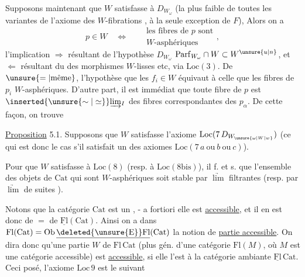 Supposons maintenant que $W$ satisfasse à $D_{W_\omega}$ (la plus faible de toutes les variantes  de l'axiome des $W$-fibrations , à la seule exception de $F$),   Alors on a
\[
p\in W \quad\Longleftrightarrow\quad
\begin{aligned}&\text{les fibres de }p\text{ sont}\\[-2pt]
& W\text{-asphériques}\end{aligned},
\]
l'implication $\Longrightarrow$ résultant de l'hypothèse $D_{W_\omega}$ $\mathrm{Parf}_{W_\omega}\cap W\subset W^{\unsure{u|n}}$, et $\Longleftarrow$ résultant du  des morphismes $W$-lisses etc, via $\mathrm{Loc}(3)$. De $\unsure{=|\text{même}}$, l'hypothèse que les $f_i\in W$ équivaut à celle que les fibres de $p_i$  $W$-asphériques.  D'autre part, il est immédiat que
toute fibre de $p$ est $\inserted{\unsure{\sim|\simeq}}\underrightarrow{\lim}_{I}$ des fibres correspondantes des $p_\alpha$. De cette façon, on trouve

\uline{Proposition} 5.1. Supposons que $W$ satisfasse l'axiome  $\mathrm{Loc}(7\,D_{W_{\unsure{\omega|W|w}}})$ (ce qui est donc le cas s'il satisfait un des axiomes  $\mathrm{Loc}(7\,a\ \text{ou}\ b\ \text{ou}\ c)$).

Pour que $W$ satisfasse à $\mathrm{Loc}(8)$ (resp. à $\mathrm{Loc}(8\mathrm{bis})$), il f. et s.   que l'ensemble des objets de $\mathrm{Cat}$ qui sont $W$-asphériques soit stable par $\underrightarrow{\lim}$ filtrantes (resp. par $\underrightarrow{\lim}$  de suites ).

  Notons que la catégorie $\mathrm{Cat}$ est un , - a fortiori elle est \uline{accessible},  et il en est donc de $=$ de $\underline{\mathrm{Fl}}(\mathrm{Cat})$. Ainsi on a dans $\mathrm{Fl}(\mathrm{Cat})=\mathrm{Ob}\,\underline{\deleted{\unsure{\mathrm{E}}}\mathrm{Fl}}(\mathrm{Cat})$ la notion
de \uline{partie accessible}. On dira donc qu'une partie $W$ de $\mathrm{Fl}\,\mathrm{Cat}$ (plus gén. d'une catégorie $\mathrm{Fl}(M)$, où $M$ est une catégorie accessible) est \uline{accessible}, si elle l'est   à la catégorie ambiante
$\underline{\mathrm{Fl}}\,\mathrm{Cat}$. Ceci posé, l'axiome $\mathrm{Loc}\,9$ est le suivant

